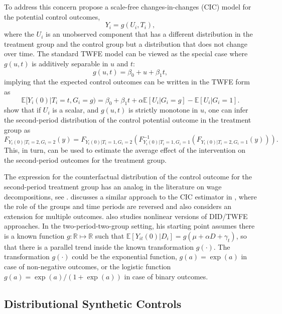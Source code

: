 \documentclass[letterpaper,12pt,leqno]{article}
\newcommand{\mme}{{\mathbb{E}}}
\begin{document}
To address this concern
\citep*{athey2006identification} propose a scale-free changes-in-changes (CIC) model for the potential control outcomes,
\[ Y_i=g(U_i,T_i),\]
where the $U_i$ is an unobserved component that has a different distribution in the treatment group and the control group but a distribution that does not change over time. The standard TWFE model can be viewed as the special case where $g(u,t)$ is additively separable  in $u$ and $t$:
\[ g(u,t)=\beta_0+u+\beta_1 t,\]
implying that the expected control outcomes can be written  in the TWFE form  as
\[ \mme[Y_i(0)|T_i=t,G_i=g)=\beta_0+\beta_1 t+\alpha \mme[U_i|G_i=g]-\mme[U_i|G_i=1].\]
\citep*{athey2006identification} show that if $U_i$ is a scalar, and $g(u,t)$ is strictly monotone in $u$, one can infer the second-period distribution of the control potential outcome in the treatment group as
\[ F_{Y_i(0)|T_i=2,G_i=2}(y)=F_{Y_i(0)|T_i=1,G_i=2}\left(F^{-1}_{Y_i(0)|T_i=1,G_i=1}\left(F_{Y_i(0)|T_i=2,G_i=1}(y)\right)\right).\]
This, in turn, can be used to estimate the average effect of the intervention on the second-period outcomes for the treatment group.

The expression for the counterfactual distribution of the control outcome for the second-period treatment group has an analog in the literature on wage decompositions, see \citep*{altonji1999race}. \citep*{arkhangelsky2019dealing} discusses a similar approach to the CIC estimator in \citep*{athey2006identification}, where the role of the groups and time periods are reversed and also considers an extension for multiple outcomes. \citep{wooldridge2022simple} also studies nonlinear versions of DID/TWFE approaches. In the two-period-two-group setting, his starting point assumes there is a known function $g:\mathbb{R}\mapsto\mathbb{R}$ such 
that $\mme[Y_{it}(0)|D_{i}]=g(\mu+\alpha D+\gamma_t)$, so that there is a parallel trend inside the known transformation $g(\cdot).$  The transformation $g(\cdot)$ could be the exponential function, $g(a)=\exp(a)$ in case of non-negative outcomes, or the logistic function $g(a)=\exp(a)/(1+\exp(a))$ in case of binary outcomes. 


\subsection{Distributional Synthetic Controls}
\end{document}
